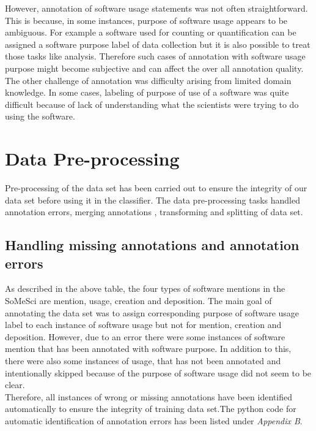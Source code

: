 However, annotation of software usage statements was not often straightforward. This is because, in some instances, purpose of software usage appears to be ambiguous. For example a software used for counting or quantification can be assigned a software purpose label of  data collection but it is also possible to treat those tasks like analysis. Therefore such cases of annotation with software usage purpose might become subjective and can affect the over all annotation quality.\\

The other challenge of annotation was difficulty arising from limited domain knowledge. In some cases, labeling of purpose of use of a software was quite difficult because of lack of understanding what the scientists were trying to do using the software.

\section{Data Pre-processing}
\label{sec:dataset:preprocessing}
Pre-processing of the data set has been carried out to ensure the integrity of our data set before using it in the classifier. The data pre-processing tasks handled annotation errors, merging annotations , transforming and splitting of data set. 

\subsection{Handling missing annotations and annotation errors }
\label{subsec:dataset:preprocessing:handlingerrors}

As described in the above table, the four types of software mentions in the SoMeSci are mention, usage, creation and deposition. The main goal of annotating the data set was to assign corresponding purpose of software usage label to each instance of software usage but not for mention, creation and deposition. However, due to an error there were some instances of software mention that has been annotated with software purpose. In addition to this, there were also some instances of usage, that has not been annotated and intentionally skipped because of the purpose of software usage did not seem to be clear. \\

Therefore, all instances of wrong or missing annotations have been identified automatically to ensure the integrity of training data set.The python code for automatic identification of annotation errors has been listed under \emph{Appendix B}.

